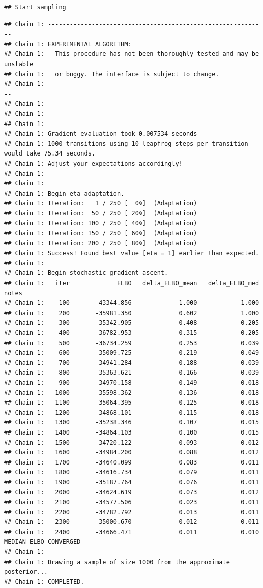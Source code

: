 \documentclass[
]{article}
\begin{document}
\begin{verbatim}
## Start sampling
\end{verbatim}

\begin{verbatim}
## Chain 1: ------------------------------------------------------------
## Chain 1: EXPERIMENTAL ALGORITHM:
## Chain 1:   This procedure has not been thoroughly tested and may be unstable
## Chain 1:   or buggy. The interface is subject to change.
## Chain 1: ------------------------------------------------------------
## Chain 1: 
## Chain 1: 
## Chain 1: 
## Chain 1: Gradient evaluation took 0.007534 seconds
## Chain 1: 1000 transitions using 10 leapfrog steps per transition would take 75.34 seconds.
## Chain 1: Adjust your expectations accordingly!
## Chain 1: 
## Chain 1: 
## Chain 1: Begin eta adaptation.
## Chain 1: Iteration:   1 / 250 [  0%]  (Adaptation)
## Chain 1: Iteration:  50 / 250 [ 20%]  (Adaptation)
## Chain 1: Iteration: 100 / 250 [ 40%]  (Adaptation)
## Chain 1: Iteration: 150 / 250 [ 60%]  (Adaptation)
## Chain 1: Iteration: 200 / 250 [ 80%]  (Adaptation)
## Chain 1: Success! Found best value [eta = 1] earlier than expected.
## Chain 1: 
## Chain 1: Begin stochastic gradient ascent.
## Chain 1:   iter             ELBO   delta_ELBO_mean   delta_ELBO_med   notes 
## Chain 1:    100       -43344.856             1.000            1.000
## Chain 1:    200       -35981.350             0.602            1.000
## Chain 1:    300       -35342.905             0.408            0.205
## Chain 1:    400       -36782.953             0.315            0.205
## Chain 1:    500       -36734.259             0.253            0.039
## Chain 1:    600       -35009.725             0.219            0.049
## Chain 1:    700       -34941.284             0.188            0.039
## Chain 1:    800       -35363.621             0.166            0.039
## Chain 1:    900       -34970.158             0.149            0.018
## Chain 1:   1000       -35598.362             0.136            0.018
## Chain 1:   1100       -35064.395             0.125            0.018
## Chain 1:   1200       -34868.101             0.115            0.018
## Chain 1:   1300       -35238.346             0.107            0.015
## Chain 1:   1400       -34864.103             0.100            0.015
## Chain 1:   1500       -34720.122             0.093            0.012
## Chain 1:   1600       -34984.200             0.088            0.012
## Chain 1:   1700       -34640.099             0.083            0.011
## Chain 1:   1800       -34616.734             0.079            0.011
## Chain 1:   1900       -35187.764             0.076            0.011
## Chain 1:   2000       -34624.619             0.073            0.012
## Chain 1:   2100       -34577.506             0.023            0.011
## Chain 1:   2200       -34782.792             0.013            0.011
## Chain 1:   2300       -35000.670             0.012            0.011
## Chain 1:   2400       -34666.471             0.011            0.010   MEDIAN ELBO CONVERGED
## Chain 1: 
## Chain 1: Drawing a sample of size 1000 from the approximate posterior... 
## Chain 1: COMPLETED.
\end{verbatim}
\end{document}
